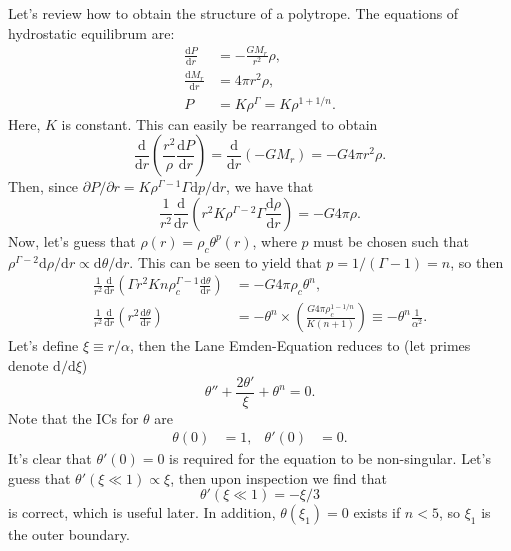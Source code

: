 \documentclass[11pt,
        usenames, %
        twocolumn,
        landscape,
        dvipsnames %
    ]{article}
\newcommand*{\rd}[2]{\frac{\mathrm{d}#1}{\mathrm{d}#2}}
\newcommand*{\rdil}[2]{\mathrm{d}#1 / \mathrm{d}#2}
\newcommand*{\pdil}[2]{\partial#1 / \partial#2}
\newcommand*{\p}[1]{\left(#1\right)}
\begin{document}
Let's review how to obtain the structure of a polytrope. The equations of
hydrostatic equilibrum are:
\begin{align}
    \rd{P}{r} &= -\frac{GM_r}{r^2}\rho,\\
    \rd{M_r}{r} &= 4\pi r^2\rho,\\
    P &= K\rho^\Gamma = K\rho^{1 + 1/n}.
\end{align}
Here, $K$ is constant. This can easily be rearranged to obtain
\begin{equation}
    \rd{}{r}\p{\frac{r^2}{\rho}\rd{P}{r}} = \rd{}{r}\p{-GM_r} = -G4\pi r^2\rho.
\end{equation}
Then, since $\pdil{P}{r} = K\rho^{\Gamma - 1}\Gamma \rdil{p}{r}$, we have that
\begin{equation}
    \frac{1}{r^2}\rd{}{r}\p{r^2 K\rho^{\Gamma - 2}\Gamma \rd{\rho}{r}}
        = -G 4\pi \rho.
\end{equation}
Now, let's guess that $\rho(r) = \rho_c \theta^p(r)$, where $p$ must be
chosen such that $\rho^{\Gamma - 2}\rdil{\rho}{r} \propto \rdil{\theta}{r}$.
This can be seen to yield that $p = 1 / (\Gamma - 1) = n$, so then
\begin{align}
    \frac{1}{r^2}\rd{}{r}\p{\Gamma r^2Kn\rho_c^{\Gamma - 1}\rd{\theta}{r}}
        &= -G 4\pi \rho_c \theta^n,\\
    \frac{1}{r^2}\rd{}{r}\p{r^2\rd{\theta}{r}}
        &= -\theta^n \times \p{\frac{G4\pi \rho_c^{1 - 1/n}}{K\p{n + 1}}}
        \equiv -\theta^n \frac{1}{\alpha^2}.
\end{align}
Let's define $\xi \equiv r/\alpha$, then the Lane Emden-Equation reduces to (let
primes denote $\rdil{}{\xi}$)
\begin{equation}
    \theta'' + \frac{2\theta'}{\xi} +\theta^n = 0.
\end{equation}
Note that the ICs for $\theta$ are
\begin{align}
    \theta(0) &= 1, & \theta'(0) &= 0.
\end{align}
It's clear that $\theta'(0) = 0$ is required for the equation to be non-singular.
Let's guess that $\theta'(\xi \ll 1) \propto \xi$, then upon inspection we find
that
\begin{equation}
    \theta'(\xi \ll 1) = -\xi / 3
\end{equation}
is correct, which is useful later. In addition, $\theta(\xi_1) = 0$ exists if $n
< 5$, so $\xi_1$ is the outer boundary.
\end{document}
